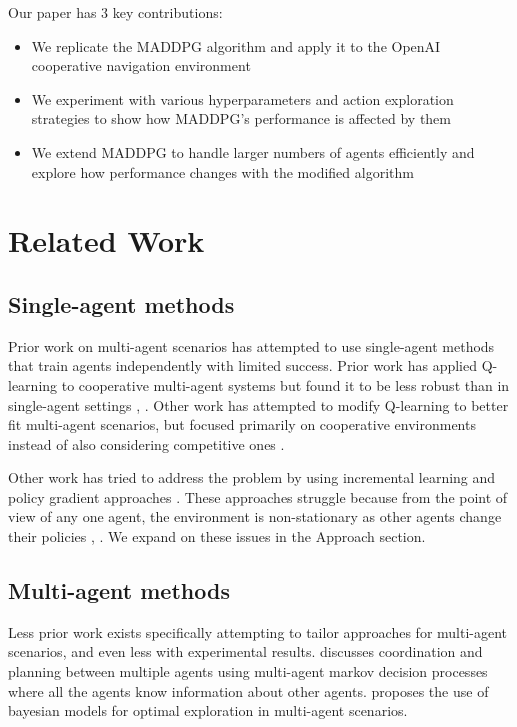 \documentclass{article}
\begin{document}
Our paper has 3 key contributions:
\begin{itemize}[nosep]
\item We replicate the MADDPG algorithm and apply it to the OpenAI cooperative navigation environment
\item We experiment with various hyperparameters and action exploration strategies to show how MADDPG's performance is affected by them
\item We extend MADDPG to handle larger numbers of agents efficiently and explore how performance changes with the modified algorithm
\end{itemize}

\section{Related Work}
\subsection{Single-agent methods}
Prior work on multi-agent scenarios has attempted to use single-agent methods that train agents independently with limited success. Prior work has applied Q-learning to cooperative multi-agent systems but found it to be less robust than in single-agent settings \cite{sandholm1996}, \cite{claus1998dynamics}. Other work has attempted to modify Q-learning to better fit multi-agent scenarios, but focused primarily on cooperative environments instead of also considering competitive ones \cite{cooperativeQ}.

Other work has tried to address the problem by using incremental learning and policy gradient approaches \cite{buffet2007}. These approaches struggle because from the point of view of any one agent, the environment is non-stationary as other agents change their policies \cite{busoniu2008comprehensive}, \cite{bucsoniu2010multi}. We expand on these issues in the Approach section.

\subsection{Multi-agent methods}

Less prior work exists specifically attempting to tailor approaches for multi-agent scenarios, and even less with experimental results. \cite{boutilier1996planning} discusses coordination and planning between multiple agents using multi-agent markov decision processes where all the agents know information about other agents. \cite{chalkiadakis2003coordination} proposes the use of bayesian models for optimal exploration in multi-agent scenarios.
\end{document}

